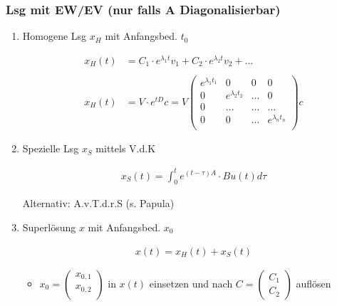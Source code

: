 \documentclass[10pt,a4paper]{article}
\begin{document}
\subsubsection{Lsg mit EW/EV (nur falls A Diagonalisierbar)}
\begin{enumerate}[(1)]
    \item Homogene Lsg $x_H$ mit Anfangsbed. $t_0$
  \begin{mdframed}[style=exercise]
    \begin{align}
        x_H(t) &= C_1\cdot e^{\lambda_1 t}v_1 + C_2 \cdot e^{\lambda_2 t}v_2 +... \\ \\
        x_H(t) &= V\cdot e^{tD}c = V
        \begin{pmatrix}
            e^{\lambda_1 t_1} & 0 & 0 & 0 \\
            0 & e^{\lambda_2 t_2}& ... & 0 \\
            0 &  ...  & ... &  ... \\
            0 & 0 & ... & e^{\lambda_n t_n}\\
        \end{pmatrix} c
    \end{align}
  \end{mdframed}

    \item Spezielle Lsg $x_S$ mittels V.d.K 
  \begin{mdframed}[style=exercise]
    \begin{align}
        x_S(t) = \displaystyle\int_{0}^{t} e^{(t-\tau)A} \cdot B u(t) d\tau
    \end{align}
  \end{mdframed}
    Alternativ: A.v.T.d.r.S (s. Papula)

\item Superlösung $x$ mit Anfangsbed. $x_0$
  \begin{mdframed}[style=exercise]
    \begin{align}
        x(t) = x_H(t) + x_S(t)
    \end{align}
  \end{mdframed}
  \begin{itemize}
      \item $x_0 = 
        \begin{pmatrix}
            x_{0,1} \\
            x_{0,2} \\
        \end{pmatrix}$ 
          in $x(t)$ einsetzen und nach $C = 
        \begin{pmatrix}
            C_1 \\
            C_2
        \end{pmatrix}$ 
          auflösen
  \end{itemize}
\end{enumerate}
\end{document}
